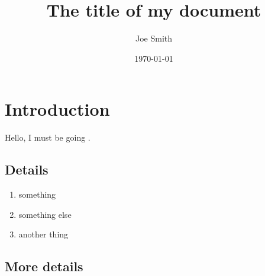 \documentclass[12pt,letterpaper]{article}
\title{The title of my document}
\author{Joe Smith}
\date{\today}
\begin{document}
\maketitle

\lipsum[1]

\section{Introduction}

\lipsum[2]

Hello, I must be going \citep{Mattar:2005}.

\lipsum[3-5]

\subsection{Details}

\lipsum[6-7]

\begin{enumerate}
\item something
\item something else
\item another thing
\end{enumerate}

\lipsum[8]

\subsection{More details}

\lipsum[9-13]



\end{document}

